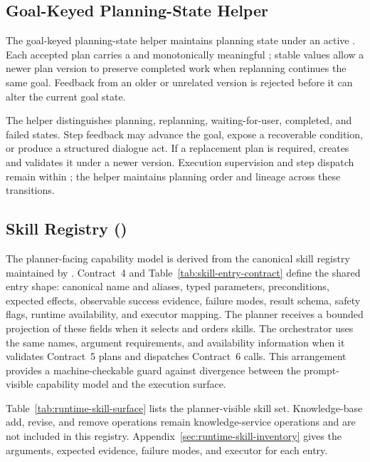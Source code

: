 \subsection{Goal-Keyed Planning-State Helper}

The goal-keyed planning-state helper maintains planning state under an active . Each accepted plan carries a  and monotonically meaningful ; stable  values allow a newer plan version to preserve completed work when replanning continues the same goal. Feedback from an older or unrelated version is rejected before it can alter the current goal state.

The helper distinguishes planning, replanning, waiting-for-user, completed, and failed states. Step feedback may advance the goal, expose a recoverable condition, or produce a structured dialogue act. If a replacement plan is required,  creates and validates it under a newer version. Execution supervision and step dispatch remain within ; the helper maintains planning order and lineage across these transitions.

\subsection{Skill Registry ()}

The planner-facing capability model is derived from the canonical skill registry maintained by . Contract~4 and Table~\ref{tab:skill-entry-contract} define the shared entry shape: canonical name and aliases, typed parameters, preconditions, expected effects, observable success evidence, failure modes, result schema, safety flags, runtime availability, and executor mapping. The planner receives a bounded projection of these fields when it selects and orders skills. The orchestrator uses the same names, argument requirements, and availability information when it validates Contract~5 plans and dispatches Contract~6 calls. This arrangement provides a machine-checkable guard against divergence between the prompt-visible capability model and the execution surface.

Table~\ref{tab:runtime-skill-surface} lists the planner-visible skill set. Knowledge-base add, revise, and remove operations remain knowledge-service operations and are not included in this registry. Appendix~\ref{sec:runtime-skill-inventory} gives the arguments, expected evidence, failure modes, and executor for each entry.

